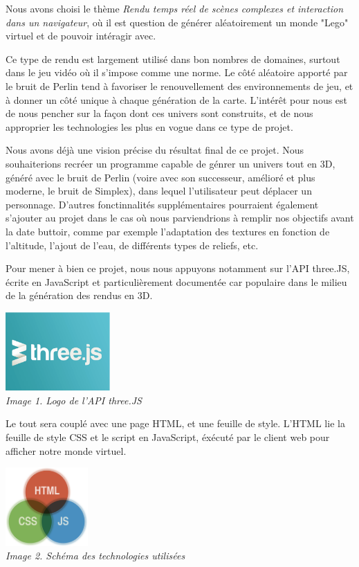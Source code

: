 Nous avons choisi le thème \textit{Rendu temps réel de scènes complexes et interaction dans un navigateur}, où il est question de générer aléatoirement un monde "Lego" virtuel et de pouvoir intéragir avec. 

Ce type de rendu est largement utilisé dans bon nombres de domaines, surtout dans le jeu vidéo où il s'impose comme une norme. Le côté aléatoire apporté par le bruit de Perlin tend à favoriser le renouvellement des environnements de jeu, et à donner un côté unique à chaque génération de la carte. L'intérêt pour nous est de nous pencher sur la façon dont ces univers sont construits, et de nous approprier les technologies les plus en vogue dans ce type de projet.

Nous avons déjà une vision précise du résultat final de ce projet. Nous souhaiterions recréer un programme capable de génrer un univers tout en 3D, généré avec le bruit de Perlin (voire avec son successeur, amélioré et plus moderne, le bruit de Simplex), dans lequel l'utilisateur peut déplacer un personnage. D'autres fonctinnalités supplémentaires pourraient également s'ajouter au projet dans le cas où nous parviendrions à remplir nos objectifs avant la date buttoir, comme par exemple l'adaptation des textures en fonction de l'altitude, l'ajout de l'eau, de différents types de reliefs, etc. 

Pour mener à bien ce projet, nous nous appuyons notamment sur l'API three.JS, écrite en JavaScript et particulièrement documentée car populaire dans le milieu de la génération des rendus en 3D.

\begin{center}
	\null\vspace{0.25cm}
	\includegraphics[height=3cm]{images/logo-threeJS.eps}\\
	\textit{Image 1. Logo de l'API three.JS}\\
\end{center}

\newpage
Le tout sera couplé avec une page HTML, et une feuille de style. L'HTML lie la feuille de style CSS et le script en JavaScript, éxécuté par le client web pour afficher notre monde virtuel.


\begin{center}
	\null\vspace{0.25cm}
	\includegraphics[height=3cm]{images/HTML-CSS-JS.eps}\\
	\textit{Image 2. Schéma des technologies utilisées}\\
\end{center}

